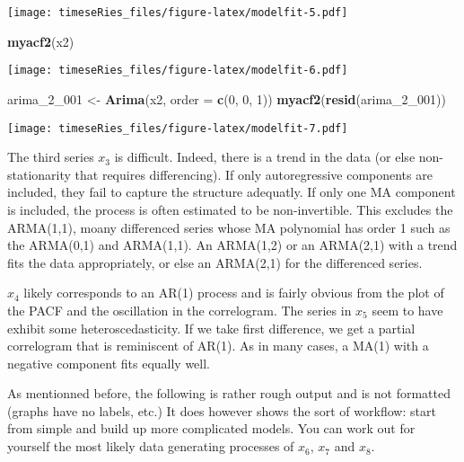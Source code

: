\documentclass[]{book}
\newenvironment{Shaded}{\begin{snugshade}}{\end{snugshade}}
\newcommand{\KeywordTok}[1]{\textcolor[rgb]{0.13,0.29,0.53}{\textbf{#1}}}
\newcommand{\DataTypeTok}[1]{\textcolor[rgb]{0.13,0.29,0.53}{#1}}
\newcommand{\DecValTok}[1]{\textcolor[rgb]{0.00,0.00,0.81}{#1}}
\newcommand{\StringTok}[1]{\textcolor[rgb]{0.31,0.60,0.02}{#1}}
\newcommand{\NormalTok}[1]{#1}
\begin{document}
\texttt{[image: timeseRies\_files/figure-latex/modelfit-5.pdf]}

\begin{Shaded}
\begin{Highlighting}[]
\KeywordTok{myacf2}\NormalTok{(x2)}
\end{Highlighting}
\end{Shaded}

\texttt{[image: timeseRies\_files/figure-latex/modelfit-6.pdf]}

\begin{Shaded}
\begin{Highlighting}[]
\NormalTok{arima_2_}\DecValTok{001}\NormalTok{ <-}\StringTok{ }\KeywordTok{Arima}\NormalTok{(x2, }\DataTypeTok{order =} \KeywordTok{c}\NormalTok{(}\DecValTok{0}\NormalTok{, }\DecValTok{0}\NormalTok{, }\DecValTok{1}\NormalTok{))}
\KeywordTok{myacf2}\NormalTok{(}\KeywordTok{resid}\NormalTok{(arima_2_}\DecValTok{001}\NormalTok{))}
\end{Highlighting}
\end{Shaded}

\texttt{[image: timeseRies\_files/figure-latex/modelfit-7.pdf]}

The third series \(x_3\) is difficult. Indeed, there is a trend in the
data (or else non-stationarity that requires differencing). If only
autoregressive components are included, they fail to capture the
structure adequatly. If only one MA component is included, the process
is often estimated to be non-invertible. This excludes the ARMA(1,1),
moany differenced series whose MA polynomial has order 1 such as the
ARMA(0,1) and ARMA(1,1). An ARMA(1,2) or an ARMA(2,1) with a trend fits
the data appropriately, or else an ARMA(2,1) for the differenced series.

\(x_4\) likely corresponds to an AR(1) process and is fairly obvious
from the plot of the PACF and the oscillation in the correlogram. The
series in \(x_5\) seem to have exhibit some heteroscedasticity. If we
take first difference, we get a partial correlogram that is reminiscent
of AR(1). As in many cases, a MA(1) with a negative component fits
equally well.

As mentionned before, the following is rather rough output and is not
formatted (graphs have no labels, etc.) It does however shows the sort
of workflow: start from simple and build up more complicated models. You
can work out for yourself the most likely data generating processes of
\(x_6\), \(x_7\) and \(x_8\).
\end{document}
